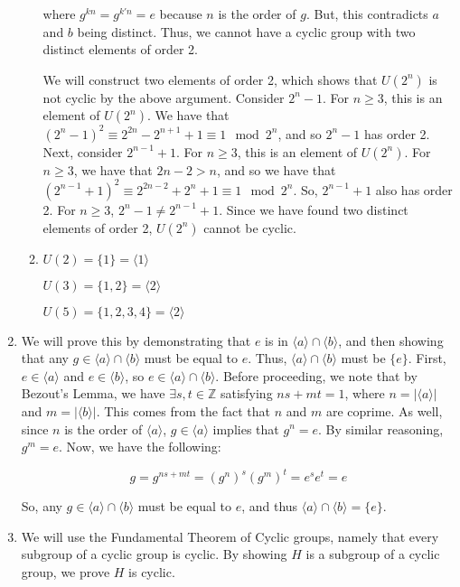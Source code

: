 \documentclass{article}
\begin{document}
\begin{enumerate}
\begin{enumerate}
            where $g^{kn} = g^{k'n} = e$ because $n$ is the order of $g$. But, this contradicts $a$ and $b$ being distinct. Thus, we cannot have a cyclic group with two distinct elements of order 2. 

            \smallskip

            We will construct two elements of order 2, which shows that $U(2^n)$ is not cyclic by the above argument. Consider $2^n - 1$. For $n \geq 3$, this is an element of $U(2^n)$. We have that $\left(2^n - 1\right)^2 \equiv 2^{2n} - 2^{n+1} + 1 \equiv 1 \mod 2^n$, and so $2^n - 1$ has order 2. Next, consider $2^{n-1} + 1$. For $n \geq 3$, this is an element of $U(2^n)$. For $n \geq 3$, we have that $2n - 2 > n$, and so we have that $\left(2^{n-1} + 1\right)^2 \equiv 2^{2n-2} + 2^n + 1 \equiv 1 \mod 2^n$. So, $2^{n-1} + 1$ also has order 2. For $n \geq 3$, $2^n - 1 \neq 2^{n-1} + 1$. Since we have found two distinct elements of order 2, $U(2^n)$ cannot be cyclic. 

            \item $U(2) = \{1\} = \langle 1 \rangle$

            $U(3) = \{1, 2\} = \langle 2 \rangle$

            $U(5) = \{1, 2, 3, 4\} = \langle 2 \rangle$
        \end{enumerate}
    \item We will prove this by demonstrating that $e$ is in $\langle a \rangle \cap \langle b \rangle$, and then showing that any $g \in \langle a \rangle \cap \langle b \rangle$ must be equal to $e$. Thus, $\langle a \rangle \cap \langle b \rangle$ must be $\{e\}$. First, $e \in \langle a \rangle$ and $e \in \langle b \rangle$, so $e \in \langle a \rangle \cap \langle b \rangle$. Before proceeding, we note that by Bezout's Lemma, we have $\exists s, t \in \mathbb{Z}$ satisfying $ns + mt = 1$, where $n = |\langle a \rangle|$ and $m = |\langle b \rangle|$. This comes from the fact that $n$ and $m$ are coprime. As well, since $n$ is the order of $\langle a \rangle$, $g \in \langle a \rangle$ implies that $g^n = e$. By similar reasoning, $g^m = e$. Now, we have the following:

    $$g = g^{ns+mt} = (g^n)^s(g^m)^t = e^se^t = e$$ 

    So, any $g \in \langle a \rangle \cap \langle b \rangle$ must be equal to $e$, and thus $\langle a \rangle \cap \langle b \rangle = \{e\}$.

    \item We will use the Fundamental Theorem of Cyclic groups, namely that every subgroup of a cyclic group is cyclic. By showing $H$ is a subgroup of a cyclic group, we prove $H$ is cyclic. 


\end{enumerate}
\end{document}
